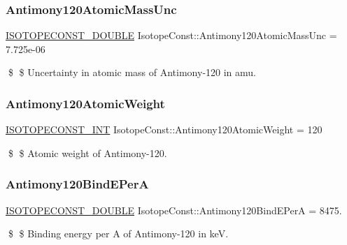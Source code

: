 \subsubsection{\texorpdfstring{Antimony120\+Atomic\+Mass\+Unc}{Antimony120AtomicMassUnc}}
{\footnotesize\ttfamily \mbox{\hyperlink{group___isotope_const-_macros_ga8f45a7272ce02c0b4c65c44636ed719a}{I\+S\+O\+T\+O\+P\+E\+C\+O\+N\+S\+T\+\_\+\+D\+O\+U\+B\+LE}} Isotope\+Const\+::\+Antimony120\+Atomic\+Mass\+Unc = 7.\+725e-\/06}

\$ \$ Uncertainty in atomic mass of Antimony-\/120 in amu. \mbox{\label{group___isotope_const-_antimony-_sb120_ga4b1f601d9e9e60f6bf1fa629092cfdd6}} 
\subsubsection{\texorpdfstring{Antimony120\+Atomic\+Weight}{Antimony120AtomicWeight}}
{\footnotesize\ttfamily \mbox{\hyperlink{group___isotope_const-_macros_ga5f18360b3e99483a35c32d789e62621c}{I\+S\+O\+T\+O\+P\+E\+C\+O\+N\+S\+T\+\_\+\+I\+NT}} Isotope\+Const\+::\+Antimony120\+Atomic\+Weight = 120}

\$ \$ Atomic weight of Antimony-\/120. \mbox{\label{group___isotope_const-_antimony-_sb120_ga16569ceb52ff453275a8726c66285ce4}} 
\subsubsection{\texorpdfstring{Antimony120\+Bind\+E\+PerA}{Antimony120BindEPerA}}
{\footnotesize\ttfamily \mbox{\hyperlink{group___isotope_const-_macros_ga8f45a7272ce02c0b4c65c44636ed719a}{I\+S\+O\+T\+O\+P\+E\+C\+O\+N\+S\+T\+\_\+\+D\+O\+U\+B\+LE}} Isotope\+Const\+::\+Antimony120\+Bind\+E\+PerA = 8475.}

\$ \$ Binding energy per A of Antimony-\/120 in keV. \mbox{\label{group___isotope_const-_antimony-_sb120_gab239b4a67e753f288517e4c257c833ff}} 
